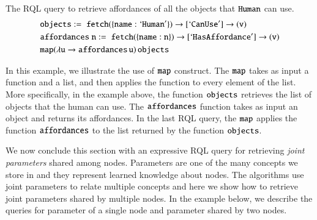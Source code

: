 \begin{example}
The RQL query to retrieve affordances of all the objects that ${\tt{Human}}$ can use.
\vskip -0.13in
{\small
\begin{align*}
&  {\tt objects }:=\; {\tt fetch (\{name:`Human'\})\rightarrow [`CanUse'] \rightarrow (v)} \\
&  {\tt affordances \;n } := \;{\tt fetch (\{name:n\})\rightarrow [`Has Affordance'] \rightarrow (v)} \\
&  {\tt map(\lambda u \rightarrow affordances \, u) \,  objects} \\
\end{align*}
}\vskip -0.15in

\noindent In this example, we illustrate the use of ${\tt map}$ construct. The ${\tt map}$ takes as input a function and a list, and then applies the function to every element of the list. More specifically, in the example above, the function ${\tt objects }$ retrieves the list of objects that the human can use. The ${\tt affordances }$ function takes as input an object and returns its affordances. In the last RQL query, the ${\tt map}$  applies the function ${\tt affordances}$ to the list returned by the function ${\tt objects}$.
\end{example}
We now conclude this section with an expressive RQL query for retrieving \textit{joint parameters} shared among nodes. Parameters are one of the many concepts we store in \robobrain{} and they represent learned knowledge about nodes. The algorithms use joint parameters to relate multiple concepts and here we show how to retrieve joint parameters shared by multiple nodes. In the example below, we describe the queries for parameter of a single node and parameter shared by two nodes.

